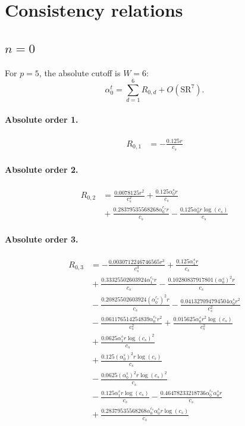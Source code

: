 \documentclass[10pt]{article}
\begin{document}
\section{Consistency relations}
\subsection{$n=0$}
For $p=5$, the absolute cutoff is $W=6$:
\[\alpha_{0}^t=\sum_{d=1}^{6}R_{0,d}+O(\mathrm{SR}^{7}).\]
\paragraph{Absolute order 1.}
\begin{align*}
R_{0,1} &=  - \frac{0.125 r}{c_{s}}
\end{align*}

\paragraph{Absolute order 2.}
\begin{align*}
R_{0,2} &= \frac{0.0078125 r^{2}}{c_{s}^{2}} + \frac{0.125 \alpha_{0}^s r}{c_{s}} \\
&{}  + \frac{0.28379535568268 \alpha_{0}^{c_s} r}{c_{s}} - \frac{0.125 \alpha_{0}^s r \log{\left(c_{s} \right)}}{c_{s}}
\end{align*}

\paragraph{Absolute order 3.}
\begin{align*}
R_{0,3} &=  - \frac{0.0030712246746565 r^{3}}{c_{s}^{3}} + \frac{0.125 \alpha_{1}^s r}{c_{s}} \\
&{}  + \frac{0.33325502603924 \alpha_{1}^{c_s} r}{c_{s}} - \frac{0.10280837917801 \left(\alpha_{0}^s\right)^{2} r}{c_{s}} \\
&{}  - \frac{0.20825502603924 \left(\alpha_{0}^{c_s}\right)^{2} r}{c_{s}} - \frac{0.041327094794504 \alpha_{0}^s r^{2}}{c_{s}^{2}} \\
&{}  - \frac{0.061176514254839 \alpha_{0}^{c_s} r^{2}}{c_{s}^{2}} + \frac{0.015625 \alpha_{0}^s r^{2} \log{\left(c_{s} \right)}}{c_{s}^{2}} \\
&{}  + \frac{0.0625 \alpha_{1}^s r \log{\left(c_{s} \right)}^{2}}{c_{s}} \\
&{}  + \frac{0.125 \left(\alpha_{0}^s\right)^{2} r \log{\left(c_{s} \right)}}{c_{s}} \\
&{}  - \frac{0.0625 \left(\alpha_{0}^s\right)^{2} r \log{\left(c_{s} \right)}^{2}}{c_{s}} \\
&{}  - \frac{0.125 \alpha_{1}^s r \log{\left(c_{s} \right)}}{c_{s}} - \frac{0.46478233218736 \alpha_{0}^{c_s} \alpha_{0}^s r}{c_{s}} \\
&{}  + \frac{0.28379535568268 \alpha_{0}^{c_s} \alpha_{0}^s r \log{\left(c_{s} \right)}}{c_{s}}
\end{align*}
\end{document}

